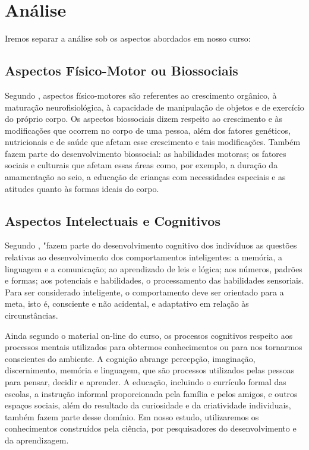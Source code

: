 \section{Análise}

Iremos separar a análise sob os aspectos abordados em nosso curso:

\subsection{Aspectos Físico-Motor ou Biossociais}

Segundo , aspectos físico-motores são referentes ao crescimento orgânico, à maturação neurofisiológica, à capacidade de manipulação de objetos e de exercício do próprio corpo.
Os aspectos biossociais dizem respeito ao crescimento e às modificações que ocorrem no corpo de uma pessoa, além dos fatores genéticos, nutricionais e de saúde que afetam esse crescimento e tais modificações. Também fazem parte do desenvolvimento biossocial: as habilidades motoras; os fatores sociais e culturais que afetam essas áreas como, por exemplo, a duração da amamentação ao seio, a educação de crianças com necessidades especiais e as atitudes quanto às formas ideais do corpo.

\subsection{Aspectos Intelectuais e Cognitivos}

Segundo , "fazem parte do desenvolvimento cognitivo dos indivíduos as questões relativas ao desenvolvimento dos comportamentos inteligentes: a memória, a linguagem e a comunicação; ao aprendizado de leis e lógica; aos números, padrões e formas; aos potenciais e habilidades, o processamento das habilidades sensoriais. Para ser considerado inteligente, o comportamento deve ser orientado para a meta, isto é, consciente e não acidental, e adaptativo em relação às circunstâncias.

Ainda segundo o material on-line do curso, os processos cognitivos respeito aos processos mentais utilizados para obtermos conhecimentos ou para nos tornarmos conscientes do ambiente. A cognição abrange percepção, imaginação, discernimento, memória e linguagem, que são processos utilizados pelas pessoas para pensar, decidir e aprender.  A educação, incluindo o currículo formal das escolas, a instrução informal proporcionada pela família e pelos amigos, e outros espaços sociais, além do resultado da curiosidade e da criatividade individuais, também fazem parte desse domínio.
Em nosso estudo, utilizaremos os conhecimentos construídos pela ciência, por pesquisadores do desenvolvimento e da aprendizagem.

